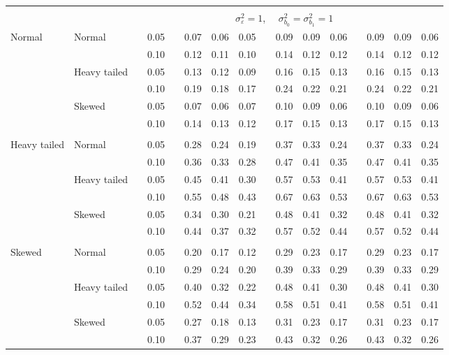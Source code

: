 \documentclass{article} %
\begin{document}
\begin{table}[ht]
\begin{scriptsize}
\begin{center}
\begin{tabular}{ll p{.1cm} c p{.1cm} rrr p{.1cm} rrr p{.1cm} rrr}
&&&&&&&&&&&&&&&\\
& && && \multicolumn{9}{c}{$\sigma_{\varepsilon}^2 = 1$, \ \ $\sigma_{b_0}^2 = \sigma_{b_1}^2 = 1$} \\ \cline{6-16}
Normal       & Normal       && 0.05 &&  0.07 & 0.06 & 0.05 && 0.09 & 0.09 & 0.06 && 0.09 & 0.09 & 0.06 \\ 
             &              && 0.10 &&  0.12 & 0.11 & 0.10 && 0.14 & 0.12 & 0.12 && 0.14 & 0.12 & 0.12 \\ 
             & Heavy tailed && 0.05 &&  0.13 & 0.12 & 0.09 && 0.16 & 0.15 & 0.13 && 0.16 & 0.15 & 0.13 \\ 
             &              && 0.10 &&  0.19 & 0.18 & 0.17 && 0.24 & 0.22 & 0.21 && 0.24 & 0.22 & 0.21 \\ 
             & Skewed       && 0.05 &&  0.07 & 0.06 & 0.07 && 0.10 & 0.09 & 0.06 && 0.10 & 0.09 & 0.06 \\ 
             &              && 0.10 &&  0.14 & 0.13 & 0.12 && 0.17 & 0.15 & 0.13 && 0.17 & 0.15 & 0.13 \\ 
             &&&&&&&&&&&&&&&\\
Heavy tailed & Normal       && 0.05 &&  0.28 & 0.24 & 0.19 && 0.37 & 0.33 & 0.24 && 0.37 & 0.33 & 0.24 \\ 
             &              && 0.10 &&  0.36 & 0.33 & 0.28 && 0.47 & 0.41 & 0.35 && 0.47 & 0.41 & 0.35 \\ 
             & Heavy tailed && 0.05 &&  0.45 & 0.41 & 0.30 && 0.57 & 0.53 & 0.41 && 0.57 & 0.53 & 0.41 \\ 
             &              && 0.10 &&  0.55 & 0.48 & 0.43 && 0.67 & 0.63 & 0.53 && 0.67 & 0.63 & 0.53 \\ 
             & Skewed       && 0.05 &&  0.34 & 0.30 & 0.21 && 0.48 & 0.41 & 0.32 && 0.48 & 0.41 & 0.32 \\ 
             &              && 0.10 &&  0.44 & 0.37 & 0.32 && 0.57 & 0.52 & 0.44 && 0.57 & 0.52 & 0.44 \\
             &&&&&&&&&&&&&&&\\ 
Skewed       & Normal       && 0.05 &&  0.20 & 0.17 & 0.12 && 0.29 & 0.23 & 0.17 && 0.29 & 0.23 & 0.17 \\ 
             &              && 0.10 &&  0.29 & 0.24 & 0.20 && 0.39 & 0.33 & 0.29 && 0.39 & 0.33 & 0.29 \\ 
             & Heavy tailed && 0.05 &&  0.40 & 0.32 & 0.22 && 0.48 & 0.41 & 0.30 && 0.48 & 0.41 & 0.30 \\ 
             &              && 0.10 &&  0.52 & 0.44 & 0.34 && 0.58 & 0.51 & 0.41 && 0.58 & 0.51 & 0.41 \\ 
             & Skewed       && 0.05 &&  0.27 & 0.18 & 0.13 && 0.31 & 0.23 & 0.17 && 0.31 & 0.23 & 0.17 \\ 
             &              && 0.10 &&  0.37 & 0.29 & 0.23 && 0.43 & 0.32 & 0.26 && 0.43 & 0.32 & 0.26 \\ 




\end{tabular}
\end{center}
\end{scriptsize}
\end{table}
\end{document}
